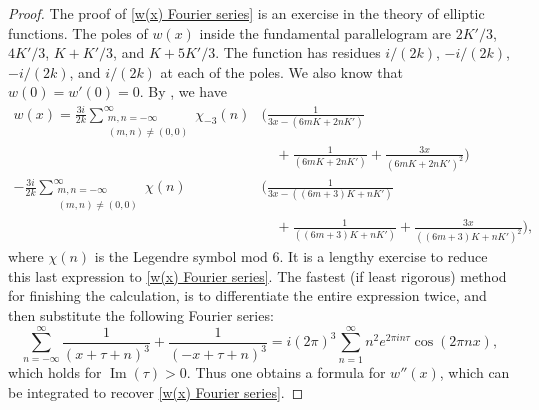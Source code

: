 \documentclass[12pt,reqno]{amsart}
\theoremstyle{remark}
\begin{document}
\begin{proof}
The proof of \eqref{w(x) Fourier series} is an
exercise in the theory of elliptic functions.  The poles of $w(x)$
inside the fundamental parallelogram are $2K'/3$, $4K'/3$,
$K+K'/3$, and $K+5K'/3$.  The function has residues $i/(2k)$,
$-i/(2k)$, $-i/(2k)$, and $i/(2k)$ at each of the poles. We also know
that $w(0)=w'(0)=0$.  By \cite[formula (27)]{BF}, we have
\begin{equation*}
\begin{split}
w(x)=\frac{3i}{2k}\sum_{\substack{m,n=-\infty\\
(m,n)\ne(0,0)}}^{\infty}\chi_{-3}(n)&\biggl(\frac{1}{3x-(6mK+2nK')}
\\ &\quad
+\frac{1}{(6m K+2nK')}+\frac{3x}{(6m K+2nK')^2}\biggr)
\\
-\frac{3i}{2k}\sum_{\substack{m,n=-\infty\\
(m,n)\ne(0,0)}}^{\infty}\chi(n)&\biggl(\frac{1}{3x-((6m+3)K+n K')}
\\ &\quad
+\frac{1}{((6m+3) K+n K')}+\frac{3x}{((6m+3) K+nK')^2}\biggr),
\end{split}
\end{equation*}
where $\chi(n)$ is the Legendre symbol mod $6$. It is a lengthy
exercise to reduce this last expression to \eqref{w(x) Fourier
series}. The fastest (if least rigorous) method for finishing the
calculation, is to differentiate the entire expression twice, and
then substitute the following Fourier series:
\begin{equation*}
\sum_{n=-\infty}^{\infty}\frac{1}{(x+\tau+n)^3}+\frac{1}{(-x+\tau+n)^3}
=i(2\pi)^3\sum_{n=1}^{\infty}n^2e^{2\pi i n\tau}\cos(2\pi n x),
\end{equation*}
which holds for ${\operatorname{Im}}(\tau)>0$.  Thus one obtains a formula for
$w''(x)$, which can be integrated to recover \eqref{w(x) Fourier
series}.


\end{proof}
\end{document}
